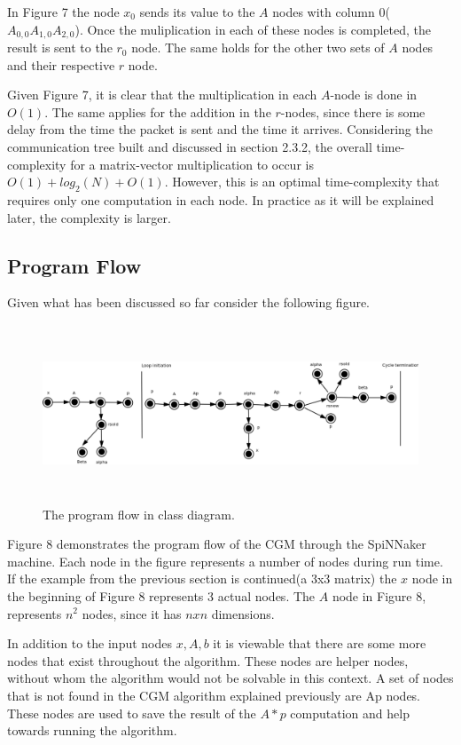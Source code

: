 \documentclass[12pt,a4paper]{article}
\begin{document}
In Figure 7 the node $x_0$ sends its value to the $A$ nodes with column 0($A_{0,0} A_{1,0} A_{2,0}$). Once the muliplication in each of these nodes is completed, the result is sent to the $r_0$ node. The same holds for the other two sets of $A$ nodes and their respective $r$ node. 

Given Figure 7, it is clear that the multiplication in each $A$-node is done in $O(1)$. The same applies for the addition in the $r$-nodes, since there is some delay from the time the packet is sent and the time it arrives. Considering the communication tree built and discussed in section 2.3.2, the overall time-complexity for a matrix-vector multiplication to occur is $O(1)+log_2(N)+O(1)$. However, this is an optimal time-complexity that requires only one computation in each node. In practice as it will be explained later, the complexity is larger.
\subsection{Program Flow}
Given what has been discussed so far consider the following figure.
\begin{figure}[h!]
\includegraphics[width=500pt,height=150pt,scale=1]{Pics/program_flow.png}
\centering
\caption{The program flow in class diagram.}
\end{figure}
Figure 8 demonstrates the program flow of the CGM through the SpiNNaker machine. Each node in the figure represents a number of nodes during run time. If the example from the previous section is continued(a 3x3 matrix) the $x$ node in the beginning of Figure 8 represents 3 actual nodes. The $A$ node in Figure 8, represents $n^2$ nodes, since it has $nxn$ dimensions.

In addition to the input nodes $x,A,b$ it is viewable that there are some more nodes that exist throughout the algorithm. These nodes are helper nodes, without whom the algorithm would not be solvable in this context. A set of nodes that is not found in the CGM algorithm explained previously are Ap nodes. These nodes are used to save the result of the $A*p$ computation and help towards running the algorithm.
\end{document}
